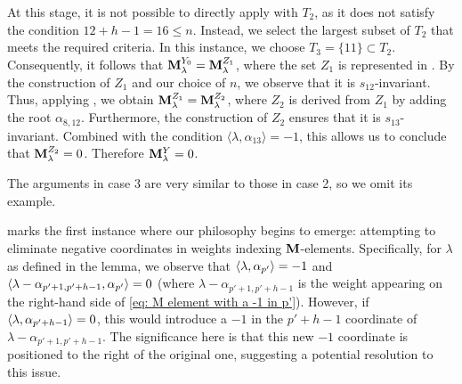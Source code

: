 \begin{example}
At this stage, it is not possible to directly apply  with $T_{2}$, as it does not satisfy the condition $12 + h - 1 = 16 \leq n$. Instead, we select the largest subset of $T_{2}$ that meets the required criteria. In this instance, we choose $T_{3} = \{11\} \subset T_{2}$. Consequently, it follows that $\mathbf{M}_{\lambda}^{Y_{0}} = \mathbf{M}_{\lambda}^{Z_{1}}$, where the set $Z_{1}$ is represented in . 
By the construction of $Z_{1}$ and our choice of $n$, we observe that it is $s_{12}$-invariant. Thus, applying , we obtain $\mathbf{M}_{\lambda}^{Z_{1}} = \mathbf{M}_{\lambda}^{Z_{2}}$, where $Z_{2}$ is derived from $Z_{1}$ by adding the root $\alpha_{8,12}$. 
Furthermore, the construction of $Z_{2}$ ensures that it is $s_{13}$-invariant. Combined with the condition $\langle \lambda, \alpha_{13} \rangle = -1$, this allows us to conclude that $\mathbf{M}_{\lambda}^{Z_{2}} = 0$. Therefore $\mathbf{M}_{\lambda}^{Y} =0$. 

\bigskip
The arguments in case 3 are very similar to those in case 2, so we omit its example.
\end{example}

 marks the first instance where our philosophy begins to emerge: attempting to eliminate negative coordinates in weights indexing $\mathbf{M}$-elements. Specifically, for $\lambda$ as defined in the lemma, we observe that $\langle \lambda , \alpha_{p'} \rangle = -1$ and $\langle \lambda - \alpha_{{p'} + 1, {p'} + h - 1} , \alpha_{p'} \rangle = 0$ (where $\lambda - \alpha_{{p'} + 1, {p'} + h - 1}$ is the weight appearing on the right-hand side of \eqref{eq: M element with a -1 in p'}). However, if $\langle \lambda , \alpha_{p'+h-1} \rangle = 0$, this would introduce a $-1$ in the ${p'} + h - 1$ coordinate of $\lambda - \alpha_{{p'} + 1, {p'} + h - 1}$. The significance here is that this new $-1$ coordinate is positioned to the right of the original one, suggesting a potential resolution to this issue. 


